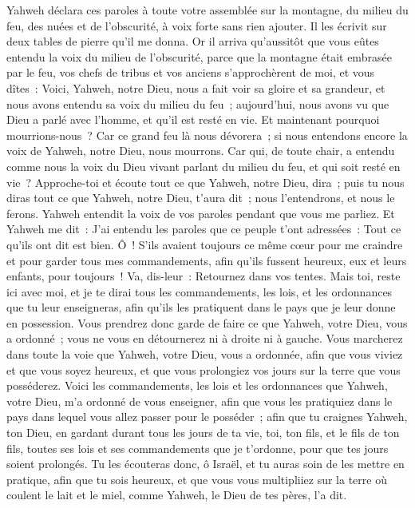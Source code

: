 \begin{multicols}{2}
Yahweh déclara ces paroles à toute votre assemblée sur la montagne, du milieu du feu, des nuées et de l'obscurité, à voix forte sans rien ajouter. Il les écrivit sur deux tables de pierre qu'il me donna.
Or il arriva qu'aussitôt que vous eûtes entendu la voix du milieu de l'obscurité, parce que la montagne était embrasée par le feu, vos chefs de tribus et vos anciens s'approchèrent de moi,
et vous dîtes~: Voici, Yahweh, notre Dieu, nous a fait voir sa gloire et sa grandeur, et nous avons entendu sa voix du milieu du feu~; aujourd'hui, nous avons vu que Dieu a parlé avec l'homme, et qu'il est resté en vie.
Et maintenant pourquoi mourrions-nous~? Car ce grand feu là nous dévorera~; si nous entendons encore la voix de Yahweh, notre Dieu, nous mourrons.
Car qui, de toute chair, a entendu comme nous la voix du Dieu vivant parlant du milieu du feu, et qui soit resté en vie~?
Approche-toi et écoute tout ce que Yahweh, notre Dieu, dira~; puis tu nous diras tout ce que Yahweh, notre Dieu, t'aura dit~; nous l'entendrons, et nous le ferons.
Yahweh entendit la voix de vos paroles pendant que vous me parliez. Et Yahweh me dit~: J'ai entendu les paroles que ce peuple t'ont adressées~: Tout ce qu'ils ont dit est bien.
Ô~! S'ils avaient toujours ce même cœur pour me craindre et pour garder tous mes commandements, afin qu'ils fussent heureux, eux et leurs enfants, pour toujours~!
Va, dis-leur~: Retournez dans vos tentes.
Mais toi, reste ici avec moi, et je te dirai tous les commandements, les lois, et les ordonnances que tu leur enseigneras, afin qu'ils les pratiquent dans le pays que je leur donne en possession.
Vous prendrez donc garde de faire ce que Yahweh, votre Dieu, vous a ordonné~; vous ne vous en détournerez ni à droite ni à gauche.
Vous marcherez dans toute la voie que Yahweh, votre Dieu, vous a ordonnée, afin que vous viviez et que vous soyez heureux, et que vous prolongiez vos jours sur la terre que vous posséderez.
\VerseOne{}Voici les commandements, les lois et les ordonnances que Yahweh, votre Dieu, m'a ordonné de vous enseigner, afin que vous les pratiquiez dans le pays dans lequel vous allez passer pour le posséder~;
afin que tu craignes Yahweh, ton Dieu, en gardant durant tous les jours de ta vie, toi, ton fils, et le fils de ton fils, toutes ses lois et ses commandements que je t'ordonne, pour que tes jours soient prolongés.
Tu les écouteras donc, ô Israël, et tu auras soin de les mettre en pratique, afin que tu sois heureux, et que vous vous multipliiez sur la terre où coulent le lait et le miel, comme Yahweh, le Dieu de tes pères, l'a dit.

\end{multicols}
